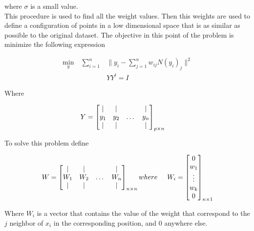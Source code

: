 \documentclass[12pt,journal]{IEEEtran}
\begin{document}
    where $\sigma$ is a small value.\\

    This procedure is used to find all the weight values. Then this weights are
    used to define a configuration of points in a low dimensional space that
    is as similar as possible to the original dataset. The objective in this
    point of the problem is minimize the following expression

    \begin{equation*}
        \begin{aligned}
            \underset{y}{\text{min}} \quad \sum_{i=1}^n & \lVert y_i - \sum_{j=1}^n w_{ij} N(y_i)_j \rVert^2 \\
            & YY^t = I
        \end{aligned}
    \end{equation*}

    Where

    \[
        Y =
        \begin{bmatrix}
            |   &  |  &       & |   \\
            y_1 & y_2 & \dots & y_n \\
            |   &  |  &       & |
        \end{bmatrix}_{p \times n}
        \hspace{0.5cm}
    \]

    To solve this problem define

    \[
        W =
        \begin{bmatrix}
            |   &  |  &       & |   \\
            W_1 & W_2 & \dots & W_n \\
            |   &  |  &       & |
        \end{bmatrix}_{n \times n}
        where
        \hspace{0.5cm}
        W_i =
        \begin{bmatrix}
            0 \\
            w_1 \\
            \vdots \\
            w_k \\
            0 \\
        \end{bmatrix}_{n \times 1}
    \]

    Where $W_i$ is a vector that contains the value of the weight that correspond
    to the $j$ neighbor of $x_i$ in the corresponding position, and 0 anywhere
    else.\\
\end{document}
